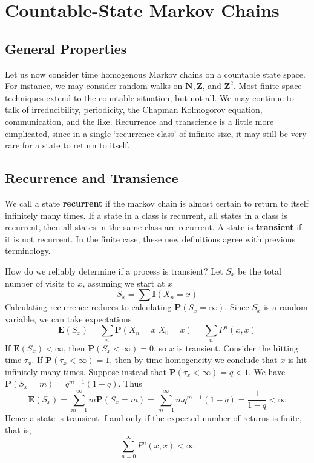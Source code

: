 \chapter{Countable-State Markov Chains}

\section{General Properties}

Let us now consider time homogenous Markov chains on a countable state space. For instance, we may consider random walks on $\mathbf{N}, \mathbf{Z}$, and $\mathbf{Z}^2$. Most finite space techniques extend to the countable situation, but not all. We may continue to talk of irreducibility, periodicity, the Chapman Kolmogorov equation, communication, and the like. Recurrence and transcience is a little more cimplicated, since in a single `recurrence class' of infinite size, it may still be very rare for a state to return to itself.

\section{Recurrence and Transience}

We call a state {\bf recurrent} if the markov chain is almost certain to return to itself infinitely many times. If a state in a class is recurrent, all states in a class is recurrent, then all states in the same class are recurrent. A state is {\bf transient} if it is not recurrent. In the finite case, these new definitions agree with previous terminology.

How do we reliably determine if a process is transient? Let $S_x$ be the total number of visits to $x$, assuming we start at $x$
%
\[ S_x = \sum \mathbf{I}(X_n = x) \]
%
Calculating recurrence reduces to calculating $\mathbf{P}(S_x = \infty)$. Since $S_x$ is a random variable, we can take expectations
%
\[ \mathbf{E}(S_x) = \sum_n \mathbf{P}(X_n = x | X_0 = x) = \sum_n P^n(x,x) \]
%
If $\mathbf{E}(S_x) < \infty$, then $\mathbf{P}(S_x < \infty) = 0$, so $x$ is transient. Consider the hitting time $\tau_x$. If $\mathbf{P}(\tau_x < \infty) = 1$, then by time homogeneity we conclude that $x$ is hit infinitely many times. Suppose instead that $\mathbf{P}(\tau_x < \infty) = q < 1$. We have $\mathbf{P}(S_x = m) = q^{m-1}(1-q)$. Thus
%
\[ \mathbf{E}(S_x) = \sum_{m = 1}^\infty m \mathbf{P}(S_x = m) = \sum_{m = 1}^\infty mq^{m-1}(1 - q) = \frac{1}{1-q} < \infty \]
%
Hence a state is transient if and only if the expected number of returns is finite, that is,
%
\[ \sum_{n = 0}^\infty P^n(x,x) < \infty \]

